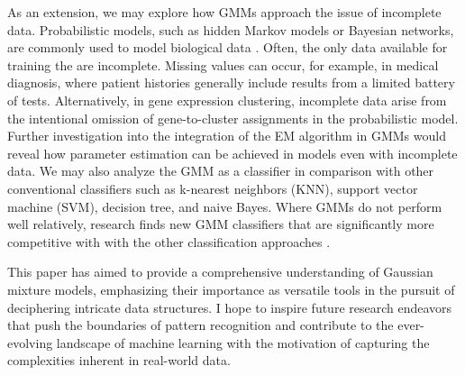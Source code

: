 \documentclass[12pt]{article}
\begin{document}
As an extension, we may explore how GMMs approach the issue of
incomplete data. Probabilistic models, such as hidden Markov models or
Bayesian networks, are commonly used to model biological data
\citep{riaz2020gaussian}. Often, the only data available for training
the are incomplete. Missing values can occur, for example, in medical
diagnosis, where patient histories generally include results from a
limited battery of tests. Alternatively, in gene expression clustering,
incomplete data arise from the intentional omission of gene-to-cluster
assignments in the probabilistic model. Further investigation into the
integration of the EM algorithm in GMMs would reveal how parameter
estimation can be achieved in models even with incomplete data. We may
also analyze the GMM as a classifier in comparison with other
conventional classifiers such as k-nearest neighbors (KNN), support
vector machine (SVM), decision tree, and naive Bayes. Where GMMs do not
perform well relatively, research finds new GMM classifiers that are
significantly more competitive with with the other classification
approaches \citep{wan2019novel}.

This paper has aimed to provide a comprehensive understanding of
Gaussian mixture models, emphasizing their importance as versatile tools
in the pursuit of deciphering intricate data structures. I hope to
inspire future research endeavors that push the boundaries of pattern
recognition and contribute to the ever-evolving landscape of machine
learning with the motivation of capturing the complexities inherent in
real-world data.



\end{document}
